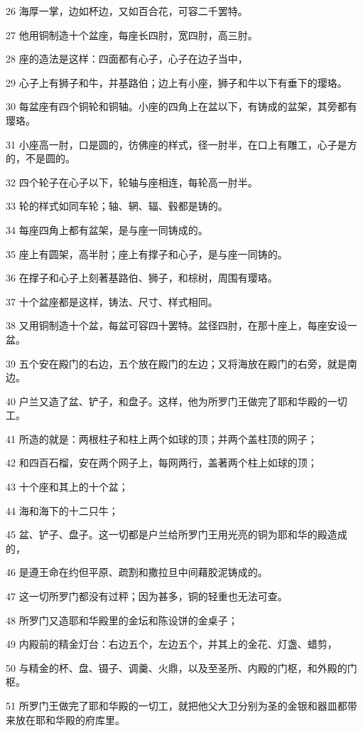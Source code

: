 \par 26 海厚一掌，边如杯边，又如百合花，可容二千罢特。
\par 27 他用铜制造十个盆座，每座长四肘，宽四肘，高三肘。
\par 28 座的造法是这样：四面都有心子，心子在边子当中，
\par 29 心子上有狮子和牛，并基路伯；边上有小座，狮子和牛以下有垂下的璎珞。
\par 30 每盆座有四个铜轮和铜轴。小座的四角上在盆以下，有铸成的盆架，其旁都有璎珞。
\par 31 小座高一肘，口是圆的，彷佛座的样式，径一肘半，在口上有雕工，心子是方的，不是圆的。
\par 32 四个轮子在心子以下，轮轴与座相连，每轮高一肘半。
\par 33 轮的样式如同车轮；轴、辋、辐、毂都是铸的。
\par 34 每座四角上都有盆架，是与座一同铸成的。
\par 35 座上有圆架，高半肘；座上有撑子和心子，是与座一同铸的。
\par 36 在撑子和心子上刻著基路伯、狮子，和棕树，周围有璎珞。
\par 37 十个盆座都是这样，铸法、尺寸、样式相同。
\par 38 又用铜制造十个盆，每盆可容四十罢特。盆径四肘，在那十座上，每座安设一盆。
\par 39 五个安在殿门的右边，五个放在殿门的左边；又将海放在殿门的右旁，就是南边。
\par 40 户兰又造了盆、铲子，和盘子。这样，他为所罗门王做完了耶和华殿的一切工。
\par 41 所造的就是：两根柱子和柱上两个如球的顶；并两个盖柱顶的网子；
\par 42 和四百石榴，安在两个网子上，每网两行，盖著两个柱上如球的顶；
\par 43 十个座和其上的十个盆；
\par 44 海和海下的十二只牛；
\par 45 盆、铲子、盘子。这一切都是户兰给所罗门王用光亮的铜为耶和华的殿造成的，
\par 46 是遵王命在约但平原、疏割和撒拉旦中间藉胶泥铸成的。
\par 47 这一切所罗门都没有过秤；因为甚多，铜的轻重也无法可查。
\par 48 所罗门又造耶和华殿里的金坛和陈设饼的金桌子；
\par 49 内殿前的精金灯台：右边五个，左边五个，并其上的金花、灯盏、蜡剪，
\par 50 与精金的杯、盘、镊子、调羹、火鼎，以及至圣所、内殿的门枢，和外殿的门枢。
\par 51 所罗门王做完了耶和华殿的一切工，就把他父大卫分别为圣的金银和器皿都带来放在耶和华殿的府库里。

